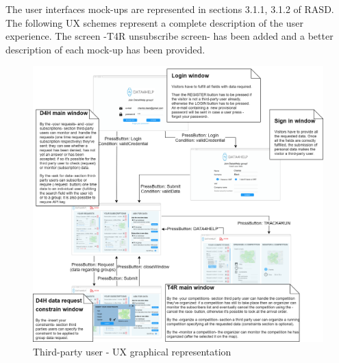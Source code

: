 The user interfaces mock-ups are represented in sections 3.1.1, 3.1.2 of RASD. The following UX schemes represent a complete description of the user experience. The screen -T4R unsubscribe screen- has been added and a better description of each mock-up has been provided.
\begin{figure}[H]
\caption{Third-party user - UX graphical representation}
\includegraphics[width = \textwidth]{sections/userInterfacesGraphs/UserExperienceDesktop.png}
\end{figure}
\clearpage
